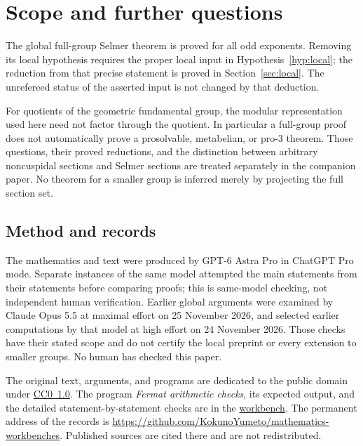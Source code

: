 \documentclass[11pt,a4paper]{article}
\newcommand{\workbenchurl}{https://github.com/KokunoYumeto/k-theory-and-galois-groups-workbench}
\newcommand{\recordurl}{https://github.com/KokunoYumeto/mathematics-workbenches}
\theoremstyle{plain}
\theoremstyle{definition}
\begin{document}
\section{Scope and further questions}\label{sec:scope}

The global full-group Selmer theorem is proved for all odd exponents.
Removing its local hypothesis requires the proper local input in
Hypothesis~\ref{hyp:local}; the reduction from that precise statement
is proved in Section~\ref{sec:local}. The unrefereed status of the
asserted input is not changed by that deduction.

For quotients of the geometric fundamental group, the modular
representation used here need not factor through the quotient.
In particular a full-group proof does not automatically prove a
prosolvable, metabelian, or pro-$3$ theorem. Those questions, their
proved reductions, and the distinction between arbitrary
noncuspidal sections and Selmer sections are treated separately
in the companion paper. No theorem for a smaller group is inferred
merely by projecting the full section set.

\subsection*{Method and records}

The mathematics and text were produced by GPT-6 Astra Pro in ChatGPT
Pro mode. Separate instances of the same model attempted the main
statements from their statements before comparing proofs; this is
same-model checking, not independent human verification. Earlier
global arguments were examined by Claude Opus 5.5 at maximal effort
on 25 November 2026, and selected earlier computations by that model
at high effort on 24 November 2026. Those checks have their stated
scope and do not certify the local preprint or every extension to
smaller groups. No human has checked this paper.

The original text, arguments, and programs are dedicated to the public
domain under \href{https://creativecommons.org/publicdomain/zero/1.0/}{CC0~1.0}.
The program \emph{Fermat arithmetic checks}, its expected output,
and the detailed statement-by-statement checks are in the
\href{\workbenchurl}{workbench}. The permanent address of the
records is \url{\recordurl}. Published sources are cited there and
are not redistributed.

\end{document}
